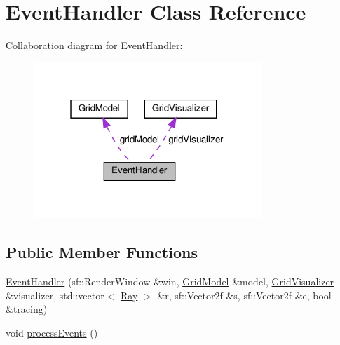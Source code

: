 \hypertarget{classEventHandler}{}\section{Event\+Handler Class Reference}
\label{classEventHandler}


Collaboration diagram for Event\+Handler\+:
\nopagebreak
\begin{figure}[H]
\begin{center}
\leavevmode
\includegraphics[width=244pt]{classEventHandler__coll__graph}
\end{center}
\end{figure}
\subsection*{Public Member Functions}
\begin{DoxyCompactItemize}
\item 
\hyperlink{classEventHandler_a37e139e7fb6fcbc58b52aafb1974fb2f}{Event\+Handler} (sf\+::\+Render\+Window \&win, \hyperlink{classGridModel}{Grid\+Model} \&model, \hyperlink{classGridVisualizer}{Grid\+Visualizer} \&visualizer, std\+::vector$<$ \hyperlink{classRay}{Ray} $>$ \&r, sf\+::\+Vector2f \&s, sf\+::\+Vector2f \&e, bool \&tracing)
\item 
void \hyperlink{classEventHandler_a1e8020642dc14ca18ef0b1cb52d19d97}{process\+Events} ()
\end{DoxyCompactItemize}
